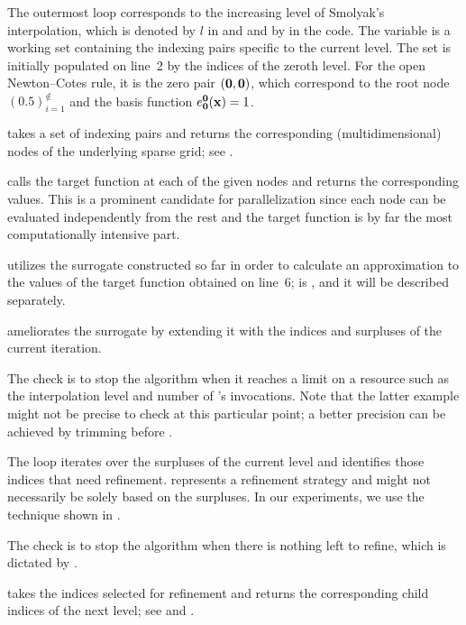 \begin{compactlist}

 The outermost loop corresponds to the increasing level of
Smolyak's interpolation, which is denoted by $l$ in  and
 and by  in the code. The 
variable is a working set containing the indexing pairs specific to the current
level. The set is initially populated on line~2 by the indices of the zeroth
level. For the open Newton--Cotes rule, it is the zero pair $(\mathbf{0}, \mathbf{0})$,
which correspond to the root node $(0.5)_{i = 1}^\nin$ and the basis function
$e^{\mathbf{0}}_{\mathbf{0}}(\mathbf{x}) = 1$.

  takes a set of indexing pairs and returns
the corresponding (multidimensional) nodes of the underlying sparse grid; see
.

  calls the target function at each of the given
nodes and returns the corresponding values. This is a prominent candidate for
parallelization since each node can be evaluated independently from the rest and
the target function is by far the most computationally intensive part.

  utilizes the surrogate constructed so far in
order to calculate an approximation to the values of the target function
obtained on line~6;  is , and it will be
described separately.

  ameliorates the surrogate by extending it with
the indices and surpluses of the current iteration.

 The check is to stop the algorithm when it reaches a limit on a
resource such as the interpolation level and number of 's
invocations. Note that the latter example might not be precise to check at this
particular point; a better precision can be achieved by trimming 
before .

 The loop iterates over the surpluses of the current level and
identifies those indices that need refinement.  represents a
refinement strategy and might not necessarily be solely based on the surpluses.
In our experiments, we use the technique shown in .

 The check is to stop the algorithm when there is nothing left
to refine, which is dictated by .

  takes the indices selected for refinement and
returns the corresponding child indices of the next level; see  and
.

\end{compactlist}

